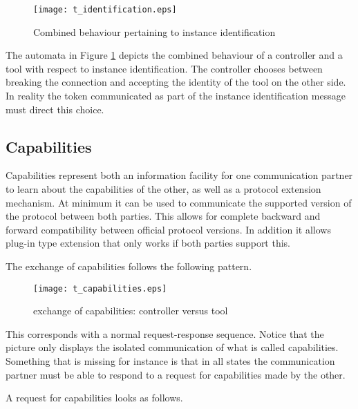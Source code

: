 \documentclass{article}
\begin{document}
   \begin{figure}[H]
    \begin{center}
     \texttt{[image: t\_identification.eps]}
    \end{center}
    \vspace{-0.3cm}
    \caption{Combined behaviour pertaining to instance identification}
    \label{fig::identification}
   \end{figure}

   \noindent The automata in Figure \ref{fig::identification} depicts the
   combined behaviour of a controller and a tool with respect to instance
   identification. The controller chooses between breaking the connection and
   accepting the identity of the tool on the other side. In reality the token
   communicated as part of the instance identification message must direct this
   choice.

  \subsection{Capabilities}

   Capabilities represent both an information facility for one communication
   partner to learn about the capabilities of the other, as well as a protocol
   extension mechanism.  At minimum it can be used to communicate the supported
   version of the protocol between both parties. This allows for complete
   backward and forward compatibility between official protocol versions. In
   addition it allows plug-in type extension that only works if both parties
   support this.
   
   The exchange of capabilities follows the following pattern.
   
   \begin{figure}[H]
    \begin{center}
     \texttt{[image: t\_capabilities.eps]}
    \end{center}
    \vspace{-0.3cm}
    \caption{exchange of capabilities: controller versus tool}
   \end{figure}

   \noindent This corresponds with a normal request-response sequence.  Notice
   that the picture only displays the isolated communication of what is called
   capabilities. Something that is missing for instance is that in all states
   the communication partner must be able to respond to a request for
   capabilities made by the other.

   \noindent A request for capabilities looks as follows.
   
\end{document}
